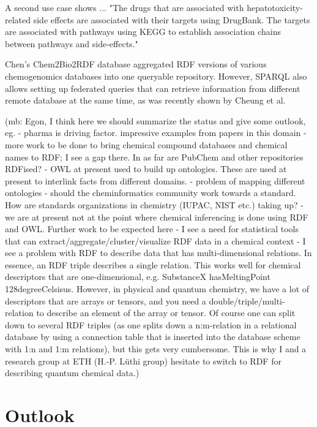 \documentclass[10pt]{bmc_article}
\newenvironment{bmcformat}{\begin{raggedright}\baselineskip20pt\sloppy\setboolean{publ}{false}}{\end{raggedright}\baselineskip20pt\sloppy}
\begin{document}
\begin{bmcformat}
A second use case shows ... "The drugs that are associated with hepatotoxicity-related side effects are associated with their targets using DrugBank. The targets are associated with pathways using KEGG to establish association chains between pathways and side-effects."

Chen's Chem2Bio2RDF database aggregated RDF versions of various chemogenomics databases
into one queryable repository. However, SPARQL also allows setting up federated
queries that can retrieve information from different remote database at the same
time, as was recently shown by Cheung et al.~\cite{Cheung2009}

(mb: Egon, I think here we should summarize the status and give some outlook, eg. 
- pharma is driving factor. impressive examples from papers in this domain
- more work to be done to bring chemical compound databases and chemical names
to RDF; I see a gap there. In as far are PubChem and other repositories RDFised?
- OWL at present used to build up ontologies. These are used at present to
interlink facts from different domains. 
- problem of mapping different ontologies - should the cheminformatics community
work towards a standard. How are standards organizations in chemistry (IUPAC,
NIST etc.) taking up?
- we are at present not at the point where chemical inferencing is done using
RDF and OWL. Further work to be expected here
- I see a need for statistical tools that can
extract/aggregate/cluster/visualize RDF data in a chemical context
- I see a problem with RDF to describe data that has multi-dimensional
relations. In essence, an RDF triple describes a single relation. This works
well for chemical descriptors that are one-dimensional, e.g. SubstanceX
hasMeltingPoint 128degreeCelsisus. However, in physical and quantum chemistry,
we have a lot of descriptors that are arrays or tensors, and you need a
double/triple/multi-relation to describe an element of the array or tensor. Of
course one can split down to several RDF triples (as one splits down a
n:m-relation in a relational database by using a connection table that is
inserted into the database scheme with 1:n and 1:m relations), but this gets
very cumbersome. This is why I and a research group at ETH (H.-P. Lüthi group)
hesitate to switch to RDF for describing quantum chemical data.)


\section{Outlook}





\end{bmcformat}
\end{document}
